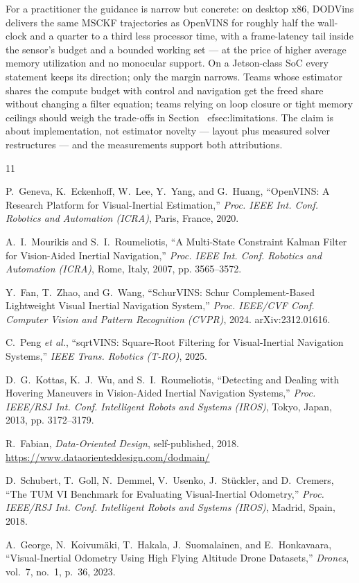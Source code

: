 \documentclass[10pt,conference,letterpaper]{IEEEtran}
\begin{document}
For a practitioner the guidance is narrow but concrete: on desktop x86,
DODVins delivers the same MSCKF trajectories as OpenVINS for roughly half
the wall-clock and a quarter to a third less processor time, with a
frame-latency tail inside the sensor's budget and a bounded working set ---
at the price of higher average memory utilization and no monocular
support. On a Jetson-class SoC every statement keeps its direction; only
the margin narrows. Teams whose estimator shares the compute budget with
control and navigation get the freed share without changing a filter
equation; teams relying on loop closure or tight memory ceilings should
weigh the trade-offs in Section~
ef{sec:limitations}. The claim is about
implementation, not estimator novelty --- layout plus measured solver
restructures --- and the measurements support both attributions.


\begin{thebibliography}{11}

P.~Geneva, K.~Eckenhoff, W.~Lee, Y.~Yang, and G.~Huang,
``OpenVINS: A Research Platform for Visual-Inertial Estimation,''
\emph{Proc. IEEE Int. Conf. Robotics and Automation (ICRA)}, Paris, France, 2020.

A.~I.~Mourikis and S.~I.~Roumeliotis,
``A Multi-State Constraint Kalman Filter for Vision-Aided Inertial Navigation,''
\emph{Proc. IEEE Int. Conf. Robotics and Automation (ICRA)}, Rome, Italy, 2007, pp. 3565--3572.

Y.~Fan, T.~Zhao, and G.~Wang,
``SchurVINS: Schur Complement-Based Lightweight Visual Inertial Navigation System,''
\emph{Proc. IEEE/CVF Conf. Computer Vision and Pattern Recognition (CVPR)}, 2024. arXiv:2312.01616.

C.~Peng \emph{et al.},
``sqrtVINS: Square-Root Filtering for Visual-Inertial Navigation Systems,''
\emph{IEEE Trans. Robotics (T-RO)}, 2025.

D.~G.~Kottas, K.~J.~Wu, and S.~I.~Roumeliotis,
``Detecting and Dealing with Hovering Maneuvers in Vision-Aided Inertial Navigation Systems,''
\emph{Proc. IEEE/RSJ Int. Conf. Intelligent Robots and Systems (IROS)}, Tokyo, Japan, 2013, pp. 3172--3179.

R.~Fabian,
\emph{Data-Oriented Design}, self-published, 2018.
\url{https://www.dataorienteddesign.com/dodmain/}

D.~Schubert, T.~Goll, N.~Demmel, V.~Usenko, J.~St{\"u}ckler, and D.~Cremers,
``The TUM VI Benchmark for Evaluating Visual-Inertial Odometry,''
\emph{Proc. IEEE/RSJ Int. Conf. Intelligent Robots and Systems (IROS)}, Madrid, Spain, 2018.

A.~George, N.~Koivum{\"a}ki, T.~Hakala, J.~Suomalainen, and E.~Honkavaara,
``Visual-Inertial Odometry Using High Flying Altitude Drone Datasets,''
\emph{Drones}, vol.~7, no.~1, p.~36, 2023.

\end{thebibliography}
\end{document}
